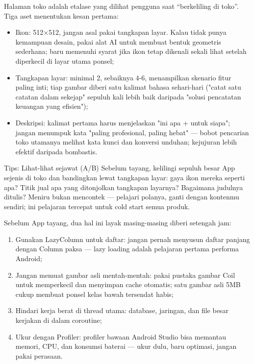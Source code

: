 
Halaman toko adalah etalase yang dilihat pengguna saat “berkeliling di toko”. Tiga aset menentukan kesan pertama:

\begin{itemize}
  \item Ikon: 512×512, jangan asal pakai tangkapan layar. Kalau tidak punya kemampuan desain, pakai alat AI untuk membuat bentuk geometris sederhana; baru memenuhi syarat jika ikon tetap dikenali sekali lihat setelah diperkecil di layar utama ponsel;
  \item Tangkapan layar: minimal 2, sebaiknya 4-6, menampilkan skenario fitur paling inti; tiap gambar diberi satu kalimat bahasa sehari-hari ("catat satu catatan dalam sekejap" sepuluh kali lebih baik daripada "solusi pencatatan keuangan yang efisien");
  \item Deskripsi: kalimat pertama harus menjelaskan "ini apa + untuk siapa"; jangan menumpuk kata "paling profesional, paling hebat" — bobot pencarian toko utamanya melihat kata kunci dan konversi unduhan; kejujuran lebih efektif daripada bombastis.
\end{itemize}

\begin{tcbinfo}{Tips: Lihat-lihat sejawat (A/B)}
Sebelum tayang, kelilingi sepuluh besar App sejenis di toko dan bandingkan lewat tangkapan layar: gaya ikon mereka seperti apa? Titik jual apa yang ditonjolkan tangkapan layarnya? Bagaimana judulnya ditulis? Meniru bukan mencontek — pelajari polanya, ganti dengan kontenmu sendiri; ini pelajaran tercepat untuk cold start semua produk.

\end{tcbinfo}


Sebelum App tayang, dua hal ini layak masing-masing diberi setengah jam:


\begin{enumerate}
  \item Gunakan LazyColumn untuk daftar: jangan pernah menyusun daftar panjang dengan Column paksa — lazy loading adalah pelajaran pertama performa Android;
  \item Jangan memuat gambar asli mentah-mentah: pakai pustaka gambar Coil untuk memperkecil dan menyimpan cache otomatis; satu gambar asli 5MB cukup membuat ponsel kelas bawah tersendat habis;
  \item Hindari kerja berat di thread utama: database, jaringan, dan file besar kerjakan di dalam coroutine;
  \item Ukur dengan Profiler: profiler bawaan Android Studio bisa memantau memori, CPU, dan konsumsi baterai — ukur dulu, baru optimasi, jangan pakai perasaan.
\end{enumerate}


